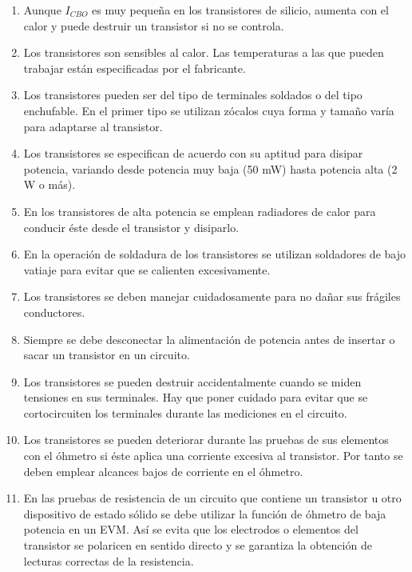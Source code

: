 \documentclass[a4paper,12pt]{article}
\begin{document}
\begin{enumerate}
          colector-base estando el emisor abierto se llama corriente de fuga o \( I_{CBO} \).
    \item Aunque \( I_{CBO} \) es muy pequeña en los transistores de silicio, aumenta con el calor y puede
          destruir un transistor si no se controla.
    \item Los transistores son sensibles al calor. Las temperaturas a las que pueden trabajar están
          especificadas por el fabricante.
    \item Los transistores pueden ser del tipo de terminales soldados o del tipo enchufable. En el
          primer tipo se utilizan zócalos cuya forma y tamaño varía para adaptarse al transistor.
    \item Los transistores se especifican de acuerdo con su aptitud para disipar potencia, variando
          desde potencia muy baja (50 mW) hasta potencia alta (2 W o más).
    \item En los transistores de alta potencia se emplean radiadores de calor para conducir éste
          desde el transistor y disiparlo.
    \item En la operación de soldadura de los transistores se utilizan soldadores de bajo vatiaje
          para evitar que se calienten excesivamente.
    \item Los transistores se deben manejar cuidadosamente para no dañar sus frágiles conductores.
    \item Siempre se debe desconectar la alimentación de potencia antes de insertar o sacar un
          transistor en un circuito.
    \item Los transistores se pueden destruir accidentalmente cuando se miden tensiones en sus terminales.
          Hay que poner cuidado para evitar que se cortocircuiten los terminales durante las mediciones en el circuito.
    \item Los transistores se pueden deteriorar durante las pruebas de sus elementos con el óhmetro si
          éste aplica una corriente excesiva al transistor. Por tanto se deben emplear alcances bajos de
          corriente en el óhmetro.
    \item En las pruebas de resistencia de un circuito que contiene un transistor u otro dispositivo de
          estado sólido se debe utilizar la función de óhmetro de baja potencia en un EVM. Así se evita que
          los electrodos o elementos del transistor se polaricen en sentido directo y se garantiza la obtención
          de lecturas correctas de la resistencia.
\end{enumerate}
\end{document}
